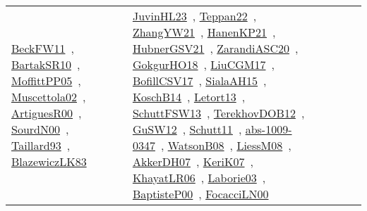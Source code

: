 {\begin{longtable}{lp{3cm}>{\raggedright\arraybackslash}p{6cm}>{\raggedright\arraybackslash}p{6cm}>{\raggedright\arraybackslash}p{8cm}}
\href{works/BeckFW11.pdf}{BeckFW11}~\cite{BeckFW11}, \href{works/BartakSR10.pdf}{BartakSR10}~\cite{BartakSR10}, \href{works/MoffittPP05.pdf}{MoffittPP05}~\cite{MoffittPP05}, \href{works/Muscettola02.pdf}{Muscettola02}~\cite{Muscettola02}, \href{works/ArtiguesR00.pdf}{ArtiguesR00}~\cite{ArtiguesR00}, \href{works/SourdN00.pdf}{SourdN00}~\cite{SourdN00}, \href{works/Taillard93.pdf}{Taillard93}~\cite{Taillard93}, \href{works/BlazewiczLK83.pdf}{BlazewiczLK83}~\cite{BlazewiczLK83} & \href{works/JuvinHL23.pdf}{JuvinHL23}~\cite{JuvinHL23}, \href{works/Teppan22.pdf}{Teppan22}~\cite{Teppan22}, \href{works/ZhangYW21.pdf}{ZhangYW21}~\cite{ZhangYW21}, \href{works/HanenKP21.pdf}{HanenKP21}~\cite{HanenKP21}, \href{works/HubnerGSV21.pdf}{HubnerGSV21}~\cite{HubnerGSV21}, \href{works/ZarandiASC20.pdf}{ZarandiASC20}~\cite{ZarandiASC20}, \href{works/GokgurHO18.pdf}{GokgurHO18}~\cite{GokgurHO18}, \href{works/LiuCGM17.pdf}{LiuCGM17}~\cite{LiuCGM17}, \href{works/BofillCSV17.pdf}{BofillCSV17}~\cite{BofillCSV17}, \href{works/SialaAH15.pdf}{SialaAH15}~\cite{SialaAH15}, \href{works/KoschB14.pdf}{KoschB14}~\cite{KoschB14}, \href{works/Letort13.pdf}{Letort13}~\cite{Letort13}, \href{works/SchuttFSW13.pdf}{SchuttFSW13}~\cite{SchuttFSW13}, \href{works/TerekhovDOB12.pdf}{TerekhovDOB12}~\cite{TerekhovDOB12}, \href{works/GuSW12.pdf}{GuSW12}~\cite{GuSW12}, \href{works/Schutt11.pdf}{Schutt11}~\cite{Schutt11}, \href{works/abs-1009-0347.pdf}{abs-1009-0347}~\cite{abs-1009-0347}, \href{works/WatsonB08.pdf}{WatsonB08}~\cite{WatsonB08}, \href{works/LiessM08.pdf}{LiessM08}~\cite{LiessM08}, \href{works/AkkerDH07.pdf}{AkkerDH07}~\cite{AkkerDH07}, \href{works/KeriK07.pdf}{KeriK07}~\cite{KeriK07}, \href{works/KhayatLR06.pdf}{KhayatLR06}~\cite{KhayatLR06}, \href{works/Laborie03.pdf}{Laborie03}~\cite{Laborie03}, \href{works/BaptisteP00.pdf}{BaptisteP00}~\cite{BaptisteP00}, \href{works/FocacciLN00.pdf}{FocacciLN00}~\cite{FocacciLN00}\\

\end{longtable}}
